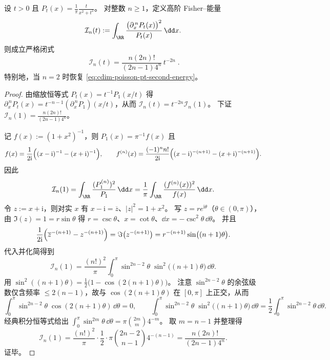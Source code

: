 \begin{proposition}\label{prop:cdim-cauchy-kernel-higher-order-fisher-energy}
设 \(t>0\) 且 \(P_t(x)=\frac{1}{\pi}\frac{t}{x^2+t^2}\)。
对整数 \(n\ge 1\)，定义高阶 Fisher--能量
\[
\mathcal I_n(t):=\int_{\RR}\frac{\bigl(\partial_x^{\,n}P_t(x)\bigr)^2}{P_t(x)}\,\dd x.
\]
则成立严格闭式
\begin{equation}\label{eq:cdim-cauchy-higher-order-fisher-energy}
\boxed{\;
\mathcal I_n(t)
=\frac{n(2n)!}{(2n-1)4^{n}}\,t^{-2n}\; }.
\end{equation}
特别地，当 \(n=2\) 时恢复 \eqref{eq:cdim-poisson-pt-second-energy}。
\end{proposition}
\begin{proof}
由缩放恒等式 \(P_t(x)=t^{-1}P_1(x/t)\) 得 \(\partial_x^{\,n}P_t(x)=t^{-n-1}(\partial_x^{\,n}P_1)(x/t)\)，从而
\(
\mathcal I_n(t)=t^{-2n}\mathcal I_n(1)
\)。
下证 \(\mathcal I_n(1)=\frac{n(2n)!}{(2n-1)4^n}\)。
\par
记 \(f(x):=(1+x^2)^{-1}\)，则 \(P_1(x)=\pi^{-1}f(x)\) 且
\[
f(x)=\frac{1}{2\mathrm{i}}\Bigl((x-\mathrm{i})^{-1}-(x+\mathrm{i})^{-1}\Bigr),
\qquad
f^{(n)}(x)=\frac{(-1)^n n!}{2\mathrm{i}}\Bigl((x-\mathrm{i})^{-(n+1)}-(x+\mathrm{i})^{-(n+1)}\Bigr).
\]
因此
\[
\mathcal I_n(1)
=\int_{\RR}\frac{(P_1^{(n)})^2}{P_1}\,\dd x
=\frac{1}{\pi}\int_{\RR}\frac{(f^{(n)}(x))^2}{f(x)}\,\dd x.
\]
令 \(z:=x+\mathrm{i}\)，则对实 \(x\) 有 \(x-\mathrm{i}=\overline z\)、\(|z|^2=1+x^2\)。
写 \(z=re^{\mathrm{i}\theta}\)（\(\theta\in(0,\pi)\)），由 \(\Im(z)=1=r\sin\theta\) 得 \(r=\csc\theta\)、\(x=\cot\theta\)、\(\dd x=-\csc^2\theta\,\dd\theta\)。
并且
\[
\frac{1}{2\mathrm{i}}\Bigl(\overline z^{-(n+1)}-z^{-(n+1)}\Bigr)
=\Im\bigl(z^{-(n+1)}\bigr)
=r^{-(n+1)}\sin\bigl((n+1)\theta\bigr).
\]
代入并化简得到
\[
\mathcal I_n(1)
=\frac{(n!)^2}{\pi}\int_{0}^{\pi}\sin^{2n-2}\theta\;\sin^2\bigl((n+1)\theta\bigr)\,\dd\theta.
\]
用 \(\sin^2((n+1)\theta)=\frac12\bigl(1-\cos(2(n+1)\theta)\bigr)\)。
注意 \(\sin^{2n-2}\theta\) 的余弦级数仅含频率 \(\le 2(n-1)\)，故与 \(\cos(2(n+1)\theta)\) 在 \([0,\pi]\) 上正交，从而
\[
\int_{0}^{\pi}\sin^{2n-2}\theta\;\cos(2(n+1)\theta)\,\dd\theta=0,
\qquad
\int_{0}^{\pi}\sin^{2n-2}\theta\;\sin^2\bigl((n+1)\theta\bigr)\,\dd\theta
=\frac12\int_{0}^{\pi}\sin^{2n-2}\theta\,\dd\theta.
\]
经典积分恒等式给出 \(\int_{0}^{\pi}\sin^{2m}\theta\,\dd\theta=\pi\binom{2m}{m}4^{-m}\)。
取 \(m=n-1\) 并整理得
\[
\mathcal I_n(1)
=\frac{(n!)^2}{\pi}\cdot\frac12\cdot\pi\binom{2n-2}{n-1}4^{-(n-1)}
=\frac{n(2n)!}{(2n-1)4^n}.
\]
证毕。
\end{proof}

